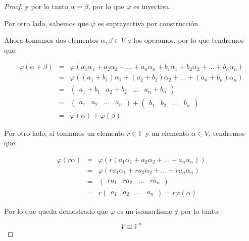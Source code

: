 \begin{proof}
			y por lo tanto $\alpha = \beta$, por lo que $\varphi$ es inyectiva.

			Por otro lado, sabemos que $\varphi$ es suprayectiva por construcción.

			Ahora tomamos dos elementos $\alpha, \beta \in V$ y los operamos, por lo que tendremos que:

			\begin{eqnarray*}
				\varphi(\alpha + \beta) & = & \varphi(a_1 \alpha_1 + a_2 \alpha_2 + \dots + a_n \alpha_n + b_1 \alpha_1 + b_2 \alpha_2 + \dots + b_n \alpha_n) \\
				& = & \varphi((a_1 + b_1) \alpha_1 + (a_2 + b_2) \alpha_2 + \dots + (a_n + b_n) \alpha_n) \\
				& = & \begin{pmatrix} a_1 + b_1 & a_2 + b_2 & \dots & a_n + b_n \end{pmatrix} \\
				& = & \begin{pmatrix} a_1 & a_2 & \dots & a_n \end{pmatrix} + \begin{pmatrix} b_1 & b_2 & \dots & b_n \end{pmatrix} \\
				& = & \varphi(\alpha) + \varphi(\beta)
			\end{eqnarray*}

			Por otro lado, si tomamos un elemento $r \in \mathbb{F}$ y un elemento $\alpha \in V$, tendremos que:

			\begin{eqnarray*}
				\varphi(r \alpha) & = & \varphi(r (a_1 \alpha_1 + a_2 \alpha_2 + \dots + a_n \alpha_n)) \\
				& = & \varphi(r a_1 \alpha_1 + r a_2 \alpha_2 + \dots + r a_n \alpha_n) \\
				& = & \begin{pmatrix} r a_1 & r a_2 & \dots & r a_n \end{pmatrix} \\
				& = & r \begin{pmatrix} a_1 & a_2 & \dots & a_n \end{pmatrix} = r \varphi(\alpha)
			\end{eqnarray*}

			Por lo que queda demostrado que $\varphi$ es un isomorfismo y por lo tanto:

			\begin{equation*}
				V \cong \mathbb{F}^n
			\end{equation*}
		\end{proof}


